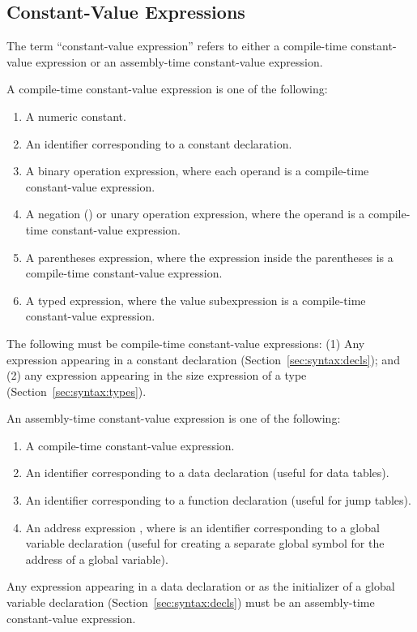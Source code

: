 \documentclass[10pt]{article}
\begin{document}
\subsection{Constant-Value Expressions}
\label{sec:semantics:constant-value-expr}

The term ``constant-value expression'' refers to either a compile-time
constant-value expression or an assembly-time constant-value
expression.

 A compile-time
constant-value expression is one of the following:
%
\begin{enumerate}
%
\item A numeric constant.
%
\item An identifier corresponding to a constant declaration.
%
\item A binary operation expression, where each operand is a
  compile-time constant-value expression.
%
\item A negation (\kwd{-}) or  unary operation expression,
  where the operand is a compile-time constant-value expression.
%
\item A parentheses expression, where the expression inside the
  parentheses is a compile-time constant-value expression.
%
\item A typed expression, where the value subexpression is a
  compile-time constant-value expression.
%
\end{enumerate}
%
The following must be compile-time constant-value expressions: (1) Any
expression appearing in a constant declaration
(Section~\ref{sec:syntax:decls}); and (2) any expression appearing in
the size expression of a type (Section~\ref{sec:syntax:types}).

 An assembly-time
constant-value expression is one of the following:
%
\begin{enumerate}
%
\item A compile-time constant-value expression.
%
\item An identifier corresponding to a data declaration (useful for
  data tables).
%
\item An identifier corresponding to a function declaration (useful
  for jump tables).
%
\item An address expression , where
   is an identifier corresponding to a global
  variable declaration (useful for creating a separate global symbol
  for the address of a global variable).
%
\end{enumerate}
%
Any expression appearing in a data declaration or as the initializer
of a global variable declaration (Section~\ref{sec:syntax:decls}) must
be an assembly-time constant-value expression.
\end{document}
